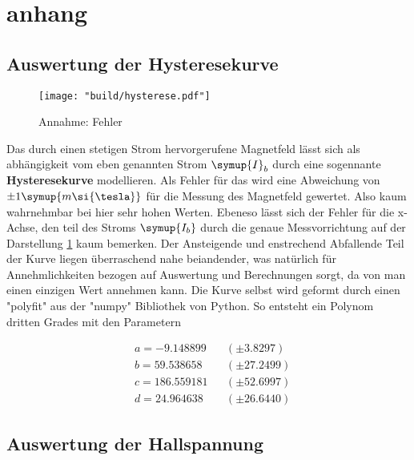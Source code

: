 \section{anhang}

\subsection{Auswertung der Hysteresekurve}
\label{sec:auswertung_hyst}

\begin{figure}
    \centering
    \texttt{[image: "build/hysterese.pdf"]}
    \caption{Annahme: Fehler }
    \label{fig:Bfeld}
 \end{figure}

 
 Das durch einen stetigen Strom hervorgerufene Magnetfeld lässt sich als abhängigkeit vom eben genannten Strom $\symup{I}_b$ durch eine sogennante \textbf{Hysteresekurve} modellieren.
 Als Fehler für das wird eine Abweichung von $\pm 1 \symup{m\si{\tesla}}$ für die Messung des Magnetfeld gewertet. Also kaum wahrnehmbar bei hier sehr hohen Werten. Ebeneso lässt sich der Fehler für die x-Achse, den teil des Stroms 
 $\symup{I_b}$ durch die genaue Messvorrichtung auf der Darstellung \ref{fig:Bfeld} kaum bemerken.
 Der Ansteigende und enstrechend Abfallende Teil der Kurve liegen überraschend nahe beiandender, was natürlich für Annehmlichkeiten bezogen auf Auswertung und Berechnungen sorgt, da von man einen einzigen Wert annehmen kann.
 Die Kurve selbst wird geformt durch einen "polyfit" aus der "numpy" Bibliothek von Python. So entsteht ein Polynom dritten Grades mit den Parametern 

\begin{align*}
&a = -9.148899 &&(\pm 3.8297) \\
&b = 59.538658 &&(\pm 27.2499) \\
&c = 186.559181 &&(\pm 52.6997) \\
&d = 24.964638 &&(\pm 26.6440 )
\end{align*}



\subsection{Auswertung der Hallspannung}
\label{sec:auswertung_hall}

